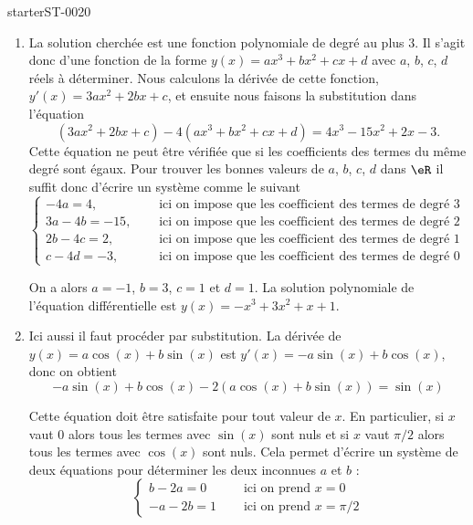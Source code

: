 
\begin{corrige}{starterST-0020}

 \begin{enumerate}
 \item La solution cherchée est une fonction polynomiale de degré au plus $3$. Il s'agit donc d'une fonction de la forme $y(x) = ax^3 + b x^2 + cx + d$ avec $a$, $b$, $c$, $d$ réels à déterminer. Nous calculons la dérivée de cette fonction, $y'(x) = 3ax^2 + 2b x + c$, et ensuite nous faisons la substitution dans l'équation 
   \[
   \left(3ax^2 + 2b x + c\right) - 4\left(ax^3 + b x^2 + cx + d\right) = 4x^3-15x^2+2x-3.
   \]
   Cette équation ne peut \^etre vérifiée que si les coefficients des termes du m\^eme degré sont égaux. Pour trouver les bonnes valeurs de $a$, $b$, $c$, $d$ dans $\eR$ il suffit donc d'écrire un système comme le suivant 
   \begin{equation*}
     \begin{cases}
       -4a = 4, \quad & \text{ ici on impose que les coefficient des termes de degré 3 soient égaux ; } \\
       3a -4b  = -15, \quad & \text{ ici on impose que les coefficient des termes de degré 2 soient égaux ; } \\
       2b -4c = 2, \quad & \text{ ici on impose que les coefficient des termes de degré 1 soient égaux ; } \\
       c-4d = -3, \quad & \text{ ici on impose que les coefficient des termes de degré 0 soient égaux. }
     \end{cases}
   \end{equation*}
   
   On a alors $a = -1$, $b = 3$, $c = 1$ et $d = 1$. La solution polynomiale de l'équation différentielle est  $y(x) = -x^3 + 3 x^2 + x +1$.  
 \item Ici aussi il faut procéder par substitution. La dérivée de $y(x) = a\cos (x)+ b\sin (x)$ est $y'(x) = -a\sin (x)+ b\cos (x)$, donc on obtient
   \[
   -a\sin (x)+ b\cos (x)  - 2\left( a\cos (x)+ b\sin (x)\right) = \sin(x)
   \]
      
      Cette équation doit \^etre satisfaite pour tout valeur de $x$. En particulier, si $x$ vaut $0$ alors tous les termes avec $\sin(x)$ sont nuls et si $x$ vaut $\pi/2$ alors tous les termes avec $\cos(x)$ sont nuls. Cela permet d'écrire un système de deux équations pour déterminer les deux inconnues $a$ et $b$ :
      \begin{equation*}
        \begin{cases}
          b  - 2 a = 0 \quad & \text{ ici on prend }x= 0   \\
          -a -2b = 1 \quad & \text{ ici on prend }x= \pi/2  
        \end{cases}
      \end{equation*}
 \end{enumerate}
 
\end{corrige}
